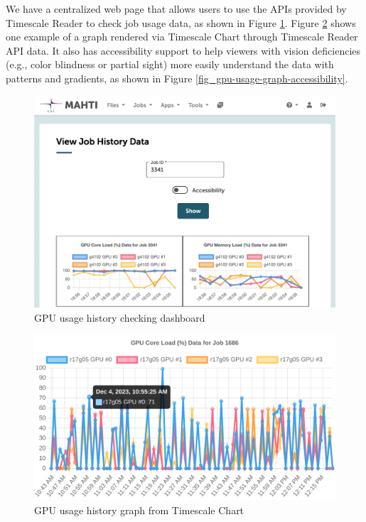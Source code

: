 We have a centralized web page that allows users to use the APIs provided by Timescale Reader to check job usage data, as shown in Figure \ref{fig_gpu-usage-history-dashboard}. Figure \ref{fig_gpu-usage-graph} shows one example of a graph rendered via Timescale Chart through Timescale Reader API data. It also has accessibility support to help viewers with vision deficiencies (e.g., color blindness or partial sight) more easily understand the data with patterns and gradients, as shown in Figure \ref{fig_gpu-usage-graph-accessibility}.

\begin{figure}[H]
    \centering
    \includegraphics[width=1\textwidth]{figures/data-dashboard.png}
    \caption{GPU usage history checking dashboard}
    \label{fig_gpu-usage-history-dashboard}
\end{figure}

\begin{figure}[H]
    \centering
    \includegraphics[width=1\textwidth]{figures/usage-graph.png}
    \caption{GPU usage history graph from Timescale Chart}
    \label{fig_gpu-usage-graph}
\end{figure}

